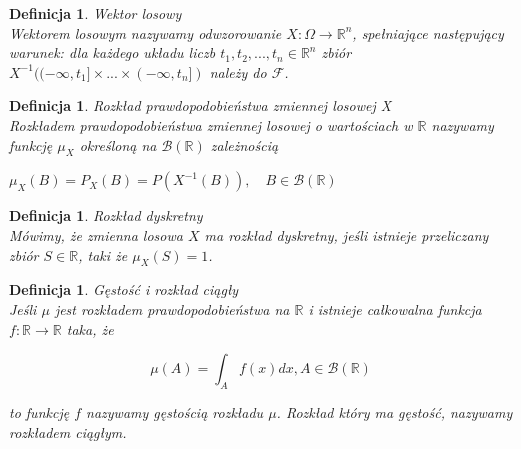 \documentclass[12pt,a4paper]{report}
\newtheorem{definition}[theorem]{Definicja}
\begin{document}
\begin{definition}{Wektor losowy \cite[Rozdział 5.1]{jakubowski2004}\\}
Wektorem losowym nazywamy odwzorowanie $X:\Omega \rightarrow \mathbb{R}^n$, spełniające następujący warunek: dla każdego układu liczb $t_1,t_2,...,t_n \in \mathbb{R}^n$ zbiór $X^{-1}((-\infty,t_1]\times...\times(-\infty,t_n])$ należy do $\mathcal{F}$.\\
\end{definition}

\begin{definition}{Rozkład prawdopodobieństwa zmiennej losowej X \cite[Rozdział 5.1]{jakubowski2004}\\}
Rozkładem prawdopodobieństwa zmiennej losowej o wartościach w $\mathbb{R}$ nazywamy funkcję $\mu_X$ określoną na $\mathcal{B}(\mathbb{R})$ zależnością
\begin{center}
$\mu_X(B)=P_X(B)=P(X^{-1}(B)), \quad B \in \mathcal{B}(\mathbb{R})$\\
\end{center} 
\end{definition}

\begin{definition}{Rozkład dyskretny \cite[Rozdział 5.1]{jakubowski2004}\\}
Mówimy, że zmienna losowa $X$ ma rozkład dyskretny, jeśli istnieje przeliczany zbiór $S \in \mathbb{R}$, taki że $\mu_X(S)=1$.\\
\end{definition}

\begin{definition}{Gęstość i rozkład ciągły \cite[Rozdział 5.1]{jakubowski2004}\\}
Jeśli $\mu$ jest rozkładem prawdopodobieństwa na $\mathbb{R}$ i istnieje całkowalna funkcja $f: \mathbb{R} \rightarrow \mathbb{R}$ taka, że 
\begin{center}
$$\mu(A)=\int_A f(x)dx,   A\in \mathcal{B}(\mathbb{R})  $$  %
\end{center}
to funkcję $f$ nazywamy gęstością rozkładu $\mu$. Rozkład który ma gęstość, nazywamy rozkładem ciągłym. \\
\end{definition}

\end{document}
